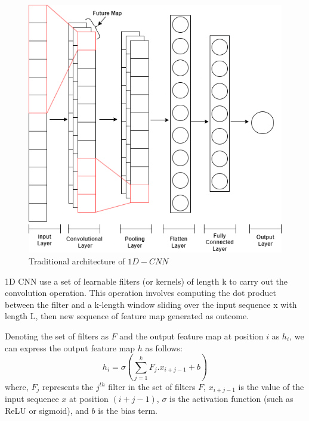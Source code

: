 \documentclass[a4paper,fleqn]{cas-dc}
\begin{document}
\begin{figure}[h!]
  \centering
    \includegraphics[scale=.5]{img/cnn}
    \caption{Traditional architecture of $1D-CNN$}\label{CNN}
\end{figure}

1D CNN use a set of learnable filters (or kernels) of length k to carry out the convolution operation. This operation involves computing the dot product between the filter and a k-length window sliding over the input sequence x with length L, then new sequence of feature map generated as outcome.

Denoting the set of filters as $F$ and the output feature map at position $i$ as $h_i$, we can express the output feature map $h$ as follows:
\begin{equation}\label{equ:cnn}
        h_i = \sigma \left (\sum_{j=1}^{k}F_{j}.x_{i+j-1}+b \right)
\end{equation}
where, $F_j$ represents the $j^{th}$ filter in the set of filters $F$, $x_{i+j-1}$ is the value of the input sequence $x$ at position $(i+j-1)$, $\sigma$ is the activation function (such as ReLU or sigmoid), and $b$ is the bias term.
\end{document}
